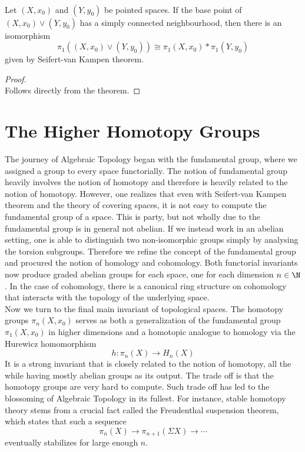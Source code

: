 \documentclass[a4paper]{article}
\begin{document}
\begin{lmm}{}{}\\
Let $(X,x_0)$ and $(Y,y_0)$ be pointed spaces. If the base point of $(X,x_0)\vee(Y,y_0)$ has a simply connected neighbourhood, then there is an isomorphism $$\pi_1((X,x_0)\vee(Y,y_0))\cong\pi_1(X,x_0)\ast\pi_1(Y,y_0)$$ given by Seifert-van Kampen theorem. 
\begin{proof}\\
Follows directly from the theorem. 
\end{proof}
\end{lmm}

\pagebreak

\section{The Higher Homotopy Groups}
The journey of Algebraic Topology began with the fundamental group, where we assigned a group to every space functorially. The notion of fundamental group heavily involves the notion of homotopy and therefore is heavily related to the notion of homotopy. However, one realizes that even with Seifert-van Kampen theorem and the theory of covering spaces, it is not easy to compute the fundamental group of a space. This is party, but not wholly due to the fundamental group is in general not abelian. If we instead work in an abelian setting, one is able to distinguish two non-isomorphic groups simply by analysing the torsion subgroups. Therefore we refine the concept of the fundamental group and procured the notion of homology and cohomology. Both functorial invariants now produce graded abelian groups for each space, one for each dimension $n\in\N$. In the case of cohomology, there is a canonical ring structure on cohomology that interacts with the topology of the underlying space. \\

Now we turn to the final main invariant of topological spaces. The homotopy groups $\pi_n(X,x_0)$ serves as both a generalization of the fundamental group $\pi_1(X,x_0)$ in higher dimensions and a homotopic analogue to homology via the Hurewicz homomorphism $$h:\pi_n(X)\to H_n(X)$$ It is a strong invariant that is closely related to the notion of homotopy, all the while having mostly abelian groups as its output. The trade off is that the homotopy groups are very hard to compute. Such trade off has led to the blossoming of Algebraic Topology in its fullest. For instance, stable homotopy theory stems from a crucial fact called the Freudenthal suspension theorem, which states that such a sequence $$\pi_n(X)\to\pi_{n+1}(\Sigma X)\to\cdots$$ eventually stabilizes for large enough $n$. \\
\end{document}
